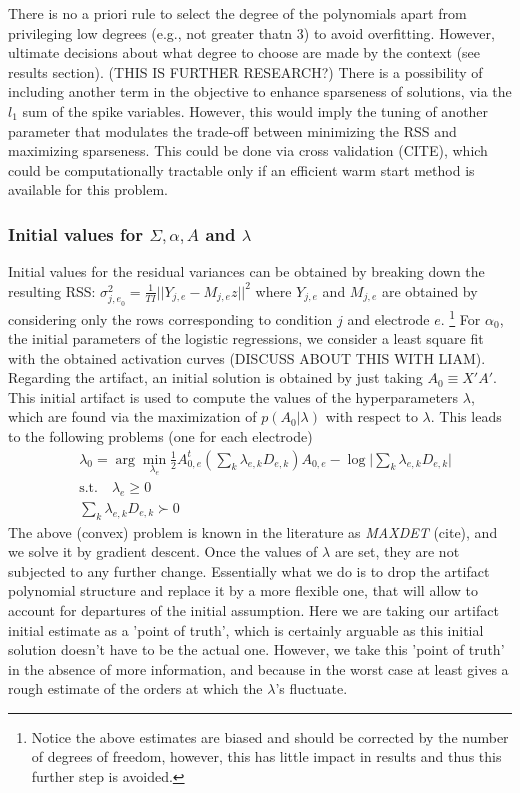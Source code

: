 \documentclass[12pt,letterpaper,fleqn]{article}
\begin{document}
There is no a priori rule to select the degree of the polynomials apart from privileging low degrees (e.g., not greater thatn 3) to avoid overfitting. However, ultimate decisions about what degree to choose are made by the context (see results section). (THIS IS FURTHER RESEARCH?) There is a possibility of including another term in the objective to enhance sparseness of solutions, via the $l_1$ sum of the spike variables. However, this would imply the tuning of another parameter that modulates the trade-off between minimizing the RSS and maximizing sparseness. This could be done via cross validation (CITE), which could be computationally tractable only if an efficient warm start method is available for this problem.


\subsubsection{Initial values for $\Sigma, \alpha,A$ and $\lambda$}
Initial values for the residual variances can be obtained by breaking down the resulting RSS: $\sigma^2_{{j,e}_0}=\frac{1}{TI}||Y_{j,e}-M_{j,e}z||^2$ where $Y_{j,e}$ and $M_{j,e}$ are obtained by considering only the rows corresponding to condition $j$ and electrode $e$. \footnote{Notice the above estimates are biased and should be corrected by the number of degrees of freedom, however, this has little impact in results and thus this further step is avoided.} For $\alpha_0$, the initial parameters of the logistic regressions, we consider a least square fit with the obtained activation curves (DISCUSS ABOUT THIS WITH LIAM). Regarding the artifact, an initial solution is obtained by just taking $A_0\equiv X'A'$. This initial artifact is used to compute the values of the hyperparameters $\lambda$, which are found via the maximization of  $p(A_0|\lambda)$ with respect to $\lambda$. This leads to the following problems (one for each electrode)
\begin{eqnarray}\nonumber & \lambda_0=\arg\min_{\lambda_e} \frac{1}{2}A_{0,e}^t\left(\sum_{k}\lambda_{e,k} D_{e,k} \right)A_{0,e}-\log \bigg|\sum_{k}\lambda_{e,k} D_{e,k}\bigg|\\ \nonumber & \text{s.t.} \quad  \lambda_e\geq 0\\ \nonumber & \sum_{k}\lambda_{e,k} D_{e,k} \succ 0
\end{eqnarray}
The above (convex) problem is known in the literature as \textit{MAXDET} (cite), and we solve it by gradient descent. Once the values of $\lambda$ are set, they are not subjected to any further change. Essentially what we do is to drop the artifact polynomial structure and replace it by a more flexible one, that will allow to account for departures of the initial assumption. Here we are taking our artifact initial estimate as a 'point of truth', which is certainly arguable as this initial solution doesn't have to be the actual one. However, we take this 'point of truth'  in the absence of more information, and because in the worst case at least gives a rough estimate of the orders at which the  $\lambda$'s fluctuate.\\
\end{document}
